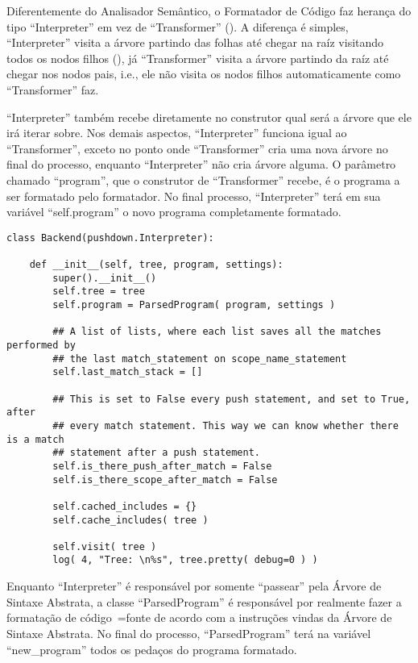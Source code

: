 Diferentemente do Analisador Semântico,
o Formatador de Código faz herança do tipo ``Interpreter'' em vez de ``Transformer'' ().
A diferença é simples,
``Interpreter'' visita a árvore partindo das folhas até chegar na raíz visitando todos os nodos filhos (),
já ``Transformer'' visita a árvore partindo da raíz até chegar nos nodos pais,
i.e.,
ele não visita os nodos filhos automaticamente como ``Transformer'' faz.

``Interpreter'' também recebe diretamente no construtor qual será a árvore que ele irá iterar sobre.
Nos demais aspectos,
``Interpreter'' funciona igual ao ``Transformer'',
exceto no ponto onde ``Transformer'' cria uma nova árvore no final do processo,
enquanto ``Interpreter'' não cria árvore alguma.
O parâmetro chamado ``program'',
que o construtor de ``Transformer'' recebe,
é o programa a ser formatado pelo formatador.
No final processo,
``Interpreter'' terá em sua variável ``self.program'' o novo programa completamente formatado.
\begin{lstlisting}[caption={Construtor do Formatador},label={construtorDoFormatador},style=mypython]
class Backend(pushdown.Interpreter):

    def __init__(self, tree, program, settings):
        super().__init__()
        self.tree = tree
        self.program = ParsedProgram( program, settings )

        ## A list of lists, where each list saves all the matches performed by
        ## the last match_statement on scope_name_statement
        self.last_match_stack = []

        ## This is set to False every push statement, and set to True, after
        ## every match statement. This way we can know whether there is a match
        ## statement after a push statement.
        self.is_there_push_after_match = False
        self.is_there_scope_after_match = False

        self.cached_includes = {}
        self.cache_includes( tree )

        self.visit( tree )
        log( 4, "Tree: \n%s", tree.pretty( debug=0 ) )
\end{lstlisting}

Enquanto ``Interpreter'' é responsável por somente ``passear'' pela Árvore de Sintaxe Abstrata,
a classe ``ParsedProgram''  é responsável por realmente fazer a formatação de código~=fonte de acordo com a instruções vindas da Árvore de Sintaxe Abstrata.
No final do processo,
``ParsedProgram'' terá na variável ``new\_program'' todos os pedaços do programa formatado.

